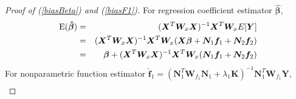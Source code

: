\documentclass[review]{elsarticle}
\begin{document}
%
%

\section{} \label{app2}

\begin{proof} [Proof of (\ref{biasBeta}) and (\ref{biasF1})]
For regression coefficient estimator $\boldsymbol {\hat \beta}$,
\begin{eqnarray*}
{\rm E}(\boldsymbol {\hat \beta}) 
&=& 
(\boldsymbol X^T  \boldsymbol W_x \boldsymbol X )^{-1} \boldsymbol X^T  \boldsymbol W_x 
E [ \boldsymbol Y] \\
&=&
(\boldsymbol X^T  \boldsymbol W_x \boldsymbol X )^{-1} \boldsymbol X^T  \boldsymbol W_x 
(\boldsymbol X \boldsymbol \beta +
 \boldsymbol N_{1} \boldsymbol f_1 + 
  \boldsymbol N_{2} \boldsymbol f_2) \\ 
&=&
 \boldsymbol \beta 
+ (\boldsymbol X^T  \boldsymbol W_x \boldsymbol X )^{-1} \boldsymbol X^T  \boldsymbol W_x   (\boldsymbol N_{1} \boldsymbol f_1 + 
  \boldsymbol N_{2} \boldsymbol f_2)
\end{eqnarray*}
For nonparametric function estimator 
$
\boldsymbol {\hat f}_1
 =
  (\boldsymbol N_1^T 
\boldsymbol W_{f_1}  \boldsymbol N_1
  + \lambda_1 \boldsymbol K)^{-1}  \boldsymbol N_1^T \boldsymbol W_{f_1} \boldsymbol Y
$,
\begin{eqnarray*}

\end{eqnarray*}
\end{proof}
\end{document}
